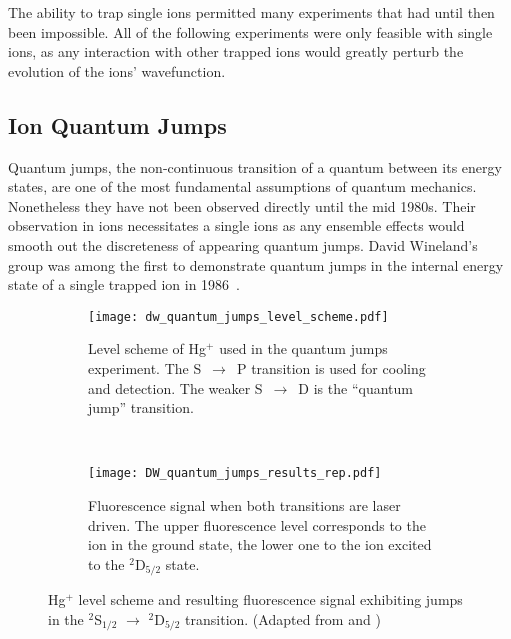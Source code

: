 The ability to trap  single ions permitted many experiments that had until
then been impossible. All of the following experiments were only feasible with single
ions, as any interaction with other trapped ions would greatly perturb the
evolution of the ions' wavefunction.

\subsection{Ion Quantum Jumps}
Quantum jumps, the non-continuous transition of a quantum between its energy
states, are one of the most fundamental assumptions of quantum mechanics.
Nonetheless they have not been observed directly until the mid 1980s. Their
observation in ions necessitates a single ions as any ensemble effects would
smooth out the discreteness of appearing quantum jumps. David Wineland's group
was among the first to demonstrate quantum jumps in the internal energy state of a single
trapped ion in 1986~\cite{bergquist1986observation}. 
\begin{figure}[t]
  \centering
  \begin{subfigure}[t]{0.4\linewidth} 
    \centering
    \texttt{[image: dw\_quantum\_jumps\_level\_scheme.pdf]}
    \caption{Level scheme of Hg$^+$ used in the quantum jumps experiment. The
      S~$\rightarrow$~P transition is used for cooling and detection. The weaker
      S~$\rightarrow$~D is the ``quantum jump'' transition.}
    \label{fig:jumps_level_scheme}
  \end{subfigure}
  ~
  \begin{subfigure}[t]{0.48\linewidth} 
    \centering
    \texttt{[image: DW\_quantum\_jumps\_results\_rep.pdf]}
    \caption{Fluorescence signal when both transitions are laser driven. The
    upper fluorescence level corresponds to the ion in the ground state, the
    lower one to the ion excited to the $^2$D$_{5/2}$ state.}
    \label{fig:jumps_results}
  \end{subfigure}
  \caption{Hg$^+$ level scheme and resulting fluorescence signal exhibiting
  jumps in the $^2$S$_{1/2}$ $\rightarrow$ $^2$D$_{5/2}$ transition. (Adapted
from \cite{wineland2012nobel} and \cite{bergquist1986observation})}
\end{figure}

